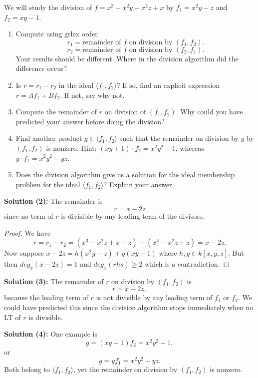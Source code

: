 \begin{tcolorbox}[title=Problem 5, breakable]
    We will study the division of $f = x^3 - x^2 y - x^2 z + x$
    by $f_1 = x^2 y - z$ and $f_2 = xy - 1$.
    \begin{enumerate}
        \item Compute using grlex order 
        \[r_1 = \text{remainder of $f$ on division by $(f_1, f_2)$}.\]
        \[r_2 = \text{remainder of $f$ on division by $(f_2, f_1)$}.\]
        Your results should be different. Where in the division algorithm did 
        the difference occur? 
        \item Is $r = r_1 - r_2$ in the ideal $\langle f_1, f_2 \rangle$?
        If so, find an explicit expression $r = A f_1 + B f_2$.
        If not, say why not.
        \item Compute the remainder of $r$ on division of $(f_1, f_2)$.
        Why could you have predicted your answer before doing the division?
        \item Find another product $g \in \langle f_1, f_2 \rangle$ such that the remainder on division 
        by $g$ by $(f_1, f_2)$ is nonzero. Hint: $(xy + 1) \cdot f_2 = x^2 y^2 - 1$, whereas $y \cdot f_1 = x^2 y^2 - yz$.
        \item Does the division algorithm give us a solution for the ideal membership problem for the ideal $\langle f_1, f_2 \rangle$?
        Explain your answer.
    \end{enumerate}
\end{tcolorbox}

\textbf{Solution (2):} The remainder is 
\[
r = x - 2z
\]
since no term of $r$ is divisible by any leading term of the divisors.

\begin{proof} 
    We have \[r = r_1 - r_2 = (x^3 - x^2 z + x - z) - (x^3 - x^2z + z) = x - 2z.\] 
    Now suppose $x - 2z = h(x^2 y - z) + g(xy - 1)$ where $h, g \in k[x, y, z]$. 
    But then $deg_x(x - 2z) = 1$ and $deg_x(rhs) \ge 2$ which is a contradiction. 
\end{proof}

\textbf{Solution (3):} The remainder of $r$ on division by $(f_1, f_2)$ is
\[
r = x - 2z,
\]
because the leading term of $r$ is not divisible by any leading term of $f_1$ or $f_2$.
We could have predicted this since the division algorithm stops immediately when no LT of $r$ is divisible.

\textbf{Solution (4):}
One example is
\[
g = (xy + 1) f_2 = x^2 y^2 - 1,
\]
or
\[
g = y f_1 = x^2 y^2 - yz.
\]
Both belong to $\langle f_1, f_2 \rangle$, yet the remainder on division by $(f_1,f_2)$ is nonzero.

